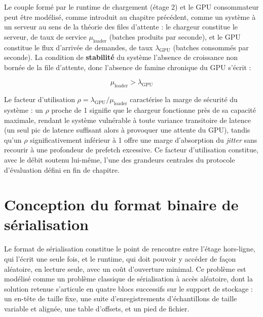 \documentclass[12pt,a4paper]{report}
\begin{document}
Le couple formé par le runtime de chargement (étage 2) et le GPU consommateur peut être modélisé, comme introduit au chapitre précédent, comme un système à un serveur au sens de la théorie des files d'attente : le chargeur constitue le serveur, de taux de service $\mu_{\text{loader}}$ (batches produits par seconde), et le GPU constitue le flux d'arrivée de demandes, de taux $\lambda_{\text{GPU}}$ (batches consommés par seconde). La condition de \textbf{stabilité} du système l'absence de croissance non bornée de la file d'attente, donc l'absence de famine chronique du GPU s'écrit :

\begin{equation}
\label{eq:stabilite}
\mu_{\text{loader}} > \lambda_{\text{GPU}}
\end{equation}

Le facteur d'utilisation $\rho = \lambda_{\text{GPU}} / \mu_{\text{loader}}$ caractérise la marge de sécurité du système : un $\rho$ proche de 1 signifie que le chargeur fonctionne près de sa capacité maximale, rendant le système vulnérable à toute variance transitoire de latence (un seul pic de latence suffisant alors à provoquer une attente du GPU), tandis qu'un $\rho$ significativement inférieur à 1 offre une marge d'absorption du \textit{jitter} sans recourir à une profondeur de prefetch excessive. Ce facteur d'utilisation constitue, avec le débit soutenu lui-même, l'une des grandeurs centrales du protocole d'évaluation défini en fin de chapitre.

\section{Conception du format binaire de sérialisation}
\label{sec:format_binaire}

Le format de sérialisation constitue le point de rencontre entre l'étage hors-ligne, qui l'écrit une seule fois, et le runtime, qui doit pouvoir y accéder de façon aléatoire, en lecture seule, avec un coût d'ouverture minimal. Ce problème est modélisé comme un problème classique de sérialisation à accès aléatoire, dont la solution retenue s'articule en quatre blocs successifs sur le support de stockage : un en-tête de taille fixe, une suite d'enregistrements d'échantillons de taille variable et alignée, une table d'offsets, et un pied de fichier.
\end{document}
